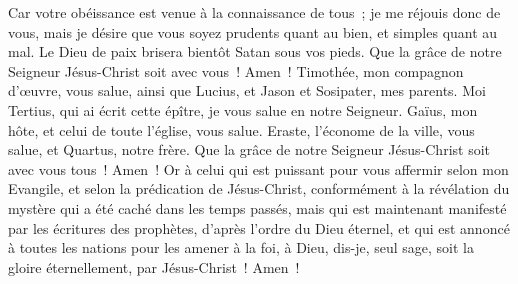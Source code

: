 \begin{multicols}{2}
Car votre obéissance est venue à la connaissance de tous~; je me réjouis donc de vous, mais je désire que vous soyez prudents quant au bien, et simples quant au mal.
Le Dieu de paix brisera bientôt Satan sous vos pieds. Que la grâce de notre Seigneur Jésus-Christ soit avec vous~! Amen~!
Timothée, mon compagnon d'œuvre, vous salue, ainsi que Lucius, et Jason et Sosipater, mes parents.
Moi Tertius, qui ai écrit cette épître, je vous salue en notre Seigneur.
Gaïus, mon hôte, et celui de toute l'église, vous salue. Eraste, l'économe de la ville, vous salue, et Quartus, notre frère.
Que la grâce de notre Seigneur Jésus-Christ soit avec vous tous~! Amen~!
Or à celui qui est puissant pour vous affermir selon mon Evangile, et selon la prédication de Jésus-Christ, conformément à la révélation du mystère qui a été caché dans les temps passés,
mais qui est maintenant manifesté par les écritures des prophètes, d'après l'ordre du Dieu éternel, et qui est annoncé à toutes les nations pour les amener à la foi,
à Dieu, dis-je, seul sage, soit la gloire éternellement, par Jésus-Christ~! Amen~!
\PPE{}
\end{multicols}
